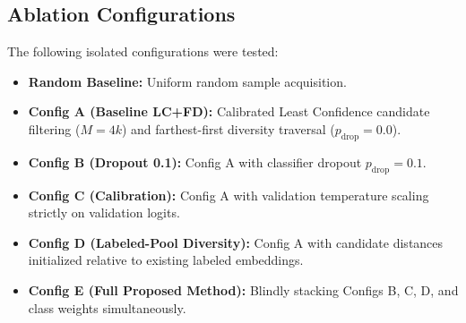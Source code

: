 \documentclass[conference,letterpaper]{IEEEtran}
\begin{document}
\subsection{Ablation Configurations}
The following isolated configurations were tested:
\begin{itemize}
    \item \textbf{Random Baseline:} Uniform random sample acquisition.
    \item \textbf{Config A (Baseline LC+FD):} Calibrated Least Confidence candidate filtering ($M=4k$) and farthest-first diversity traversal ($p_{\text{drop}}=0.0$).
    \item \textbf{Config B (Dropout 0.1):} Config A with classifier dropout $p_{\text{drop}}=0.1$.
    \item \textbf{Config C (Calibration):} Config A with validation temperature scaling strictly on validation logits.
    \item \textbf{Config D (Labeled-Pool Diversity):} Config A with candidate distances initialized relative to existing labeled embeddings.
    \item \textbf{Config E (Full Proposed Method):} Blindly stacking Configs B, C, D, and class weights simultaneously.
\end{itemize}
\end{document}
